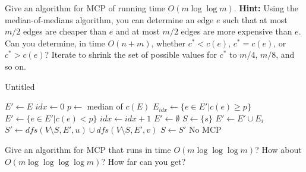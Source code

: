 \documentclass[11pt,a4paper,oneside]{article}
\begin{document}
\begin{problem}{2}
	\statement
	Give an algorithm for MCP of running time $O(m \log \log m)$. \textbf{Hint:} Using the median-of-medians algorithm,
	you can determine an edge $e$ such that at most $m/2$ edges are cheaper than $e$ and at most $m/2$ edges are
	more expensive than $e$. Can you determine, in time $O(n+m)$, whether $c^* < c(e)$, $c^* = c(e)$, or $c^* > c(e)$?
	Iterate to shrink the set of possible
	values for $c^*$ to $m/4$, $m/8$, and so on.

	\solution
	
	\begin{algorithm}
		\caption{Untitled}
		\begin{algorithmic}[1]
			\State $E' \gets E$
			\State $idx \gets 0$
				\State $p \gets$ median of $c(E)$
				\State $E_{idx} \gets \{e \in E' | c(e) \geq p\}$
				\State $E' \gets \{e \in E' | c(e) < p\}$
				\State $idx \gets idx + 1$
			\EndWhile
			\State $E' \gets \emptyset$
			\State $S \gets \{s\}$
				\State $E' \gets E' \cup E_i$
					\State $S' \gets dfs(V \setminus S, E', u) \cup dfs(V \setminus S, E', v)$
					\State $S \gets S'$
				\EndFor
					\State {}
				\EndIf
			\EndFor
			\State \Return No MCP
			\EndFunction
		\end{algorithmic}
	\end{algorithm}
	
\end{problem}
\begin{problem}{3}
	\statement
	Give an algorithm for MCP that runs in time $O(m \log \log \log m)$? How about $O(m \log \log \log \log m)$? How far can you get?

\end{problem}
\end{document}
